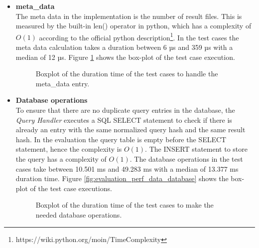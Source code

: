 \documentclass[draft,final]{vutinfth} %
\begin{document}
\begin{itemize}
	\item \textbf{meta\_data} \\
	The meta data in the implementation is the number of result files. This is measured by the built-in len() operator in python, which has a complexity of $O(1)$ according to the official python description\footnote{https://wiki.python.org/moin/TimeComplexity}. In the test cases the meta data calculation takes a duration between 6 µs and 359 µs with a median of 12 µs. Figure \ref{fig:evaluation_perf_meta_data} shows the box-plot of the test case execution.
	\begin{figure}[!h]
		\centering
		\caption{Boxplot of the duration time of the test cases to handle the meta\_data entry.}
		\label{fig:evaluation_perf_meta_data}	
	\end{figure}
	\item \textbf{Database operations} \\
	To ensure that there are no duplicate query entries in the database, the \textit{Query Handler} executes a SQL SELECT statement to check if there is already an entry with the same normalized query hash and the same result hash. In the evaluation the query table is empty before the SELECT statement, hence the complexity is $O(1)$. The INSERT statement to store the query has a complexity of $O(1)$. The database operations in the test cases take between 10.501 ms and 49.283 ms with a median of 13.377 ms duration time. Figure \ref{fig:evaluation_perf_data_database} shows the box-plot of the test case executions.  
	\begin{figure}[!h]
		\centering
		\caption{Boxplot of the duration time of the test cases to make the needed database operations.}

\end{figure}
\end{itemize}
\end{document}
